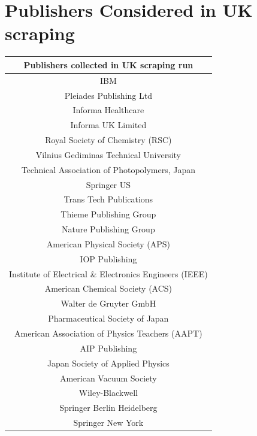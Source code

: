 \section{Publishers Considered in UK scraping}
\begin{table}
\begin{tabular}{||c||}
\hline
Publishers collected in UK scraping run \\
\hline 
IBM                                               \\
Pleiades Publishing Ltd                           \\
Informa Healthcare                                \\
Informa UK Limited                                \\
Royal Society of Chemistry (RSC)                  \\
Vilnius Gediminas Technical University            \\
Technical Association of Photopolymers, Japan     \\
Springer US                                       \\
Trans Tech Publications                           \\
Thieme Publishing Group                           \\
Nature Publishing Group                           \\
American Physical Society (APS)                   \\
IOP Publishing                                    \\
Institute of Electrical \& Electronics Engineers (IEEE)\\
American Chemical Society (ACS)                   \\
Walter de Gruyter GmbH                            \\
Pharmaceutical Society of Japan                   \\
American Association of Physics Teachers (AAPT)   \\
AIP Publishing                                    \\
Japan Society of Applied Physics                  \\
American Vacuum Society                           \\
Wiley-Blackwell                                   \\
Springer Berlin Heidelberg                        \\
Springer New York                                 \\

\end{tabular}
\end{table}
